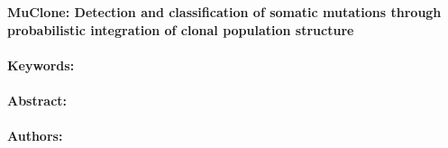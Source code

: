 \noindent
\large {\bf MuClone: Detection and classification of somatic mutations through probabilistic integration of clonal population structure} 


\normalsize 


\noindent \paragraph{Keywords:} 

\noindent \paragraph{Abstract:} 



\noindent \paragraph{Authors:} 

